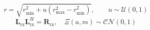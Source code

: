 \[r=\sqrt{r_{\min}^{2}+u(r_{\max}^{2}-r_{\min}^{2})},\qquad u\sim\mathcal{U}(0,1)\]
\[\mathbf{L}_{\mathrm{rx}}\mathbf{L}_{\mathrm{rx}}^{H}=\mathbf{R}_{\mathrm{rx}},\quad \Xi(a,m)\sim\mathcal{CN}(0,1)\]